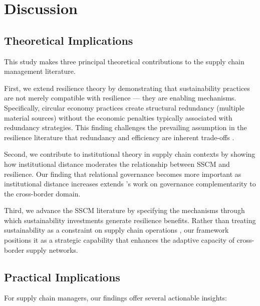 \documentclass[12pt,a4paper,twoside]{article}
\begin{document}
\section{Discussion}
\label{sec:discussion}

\subsection{Theoretical Implications}

This study makes three principal theoretical contributions to the supply chain
management literature.

First, we extend resilience theory by demonstrating that sustainability
practices are not merely compatible with resilience --- they are enabling
mechanisms.  Specifically, circular economy practices create structural
redundancy (multiple material sources) without the economic penalties typically
associated with redundancy strategies.  This finding challenges the prevailing
assumption in the resilience literature that redundancy and efficiency are
inherent trade-offs \citep{ivanov2017lean, pettit2019resilience}.

Second, we contribute to institutional theory in supply chain contexts by
showing how institutional distance moderates the relationship between SSCM and
resilience.  Our finding that relational governance becomes more important as
institutional distance increases extends \citet{cao2015revisiting}'s work on
governance complementarity to the cross-border domain.

Third, we advance the SSCM literature by specifying the mechanisms through which
sustainability investments generate resilience benefits.  Rather than
treating sustainability as a constraint on supply chain operations
\citep{seuring2013review}, our framework positions it as a strategic
capability that enhances the adaptive capacity of cross-border supply networks.

\subsection{Practical Implications}

For supply chain managers, our findings offer several actionable insights:
\end{document}
